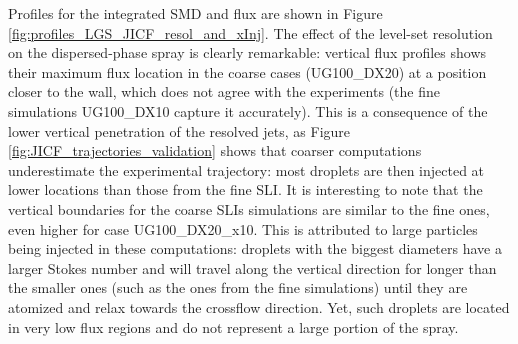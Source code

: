 Profiles for the integrated SMD and flux are shown in Figure \ref{fig:profiles_LGS_JICF_resol_and_xInj}. The effect of the level-set resolution on the dispersed-phase spray is clearly remarkable: vertical flux profiles shows their maximum flux location in the coarse cases (UG100\_DX20) at a position closer to the wall, which does not agree with the experiments (the fine simulations UG100\_DX10 capture it accurately). This is a consequence of the lower vertical penetration of the resolved jets, as Figure \ref{fig:JICF_trajectories_validation} shows that coarser computations underestimate the experimental trajectory: most droplets are then injected at lower locations than those from the fine SLI. It is interesting to note that the vertical boundaries for the coarse SLIs simulations are similar to the fine ones, even higher for case UG100\_DX20\_x10. This is attributed to large particles being injected in these computations: droplets with the biggest diameters have a larger Stokes number and will travel along the vertical direction for longer than the smaller ones (such as the ones from the fine simulations) until they are atomized and relax towards the crossflow direction. Yet, such droplets are located in very low flux regions and do not represent a large portion of the spray. 

